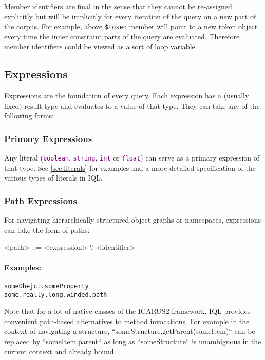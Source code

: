 \documentclass[11pt,a4paper,portrait]{article}
\newcommand{\iql}{IQL\xspace}
\newcommand{\keyword}[1]{\textcolor{purple}{\texttt{#1}}}
\begin{document}
Member identifiers are final in the sense that they cannot be re-assigned explicitly but will be implicitly for every iteration of the query on a new part of the corpus. For example, above \texttt{\$token} member will point to a new token object every time the inner constraint parts of the query are evaluated. Therefore member identifiers could be viewed as a sort of loop variable. 

\subsection{Expressions}
\label{sec:expressions}

Expressions are the foundation of every query.
Each expression has a (usually fixed) result type and evaluates to a value of that type.
They can take any of the following forms:

\subsubsection{Primary Expressions}
\label{sec:primary-expressions}

Any literal (\keyword{boolean}, \keyword{string}, \keyword{int} or \keyword{float}) can serve as a primary expression of that type.
See \cref{sec:literals} for examples and a more detailed specification of the various types of literals in \iql.

\subsubsection{Path Expressions}
\label{sec:path-expressions}

For navigating hierarchically structured object graphs or namespaces, expressions can take the form of paths:
\begin{grammar}	
<path> ::= <expression> `.' <identifier> 	
\end{grammar}

\paragraph{Examples:}

\begin{verbatim}
someObejct.someProperty
some.really.long.winded.path
\end{verbatim}

\noindent Note that for a lot of native classes of the ICARUS2 framework, \iql provides convenient path-based alternatives to method invocations. For example in  the context of navigating a structure, ``someStructure.getParent(someItem)`` can be replaced by ``someItem.parent`` as long as ``someStructure`` is unambiguous in the current context and already bound.
\end{document}
